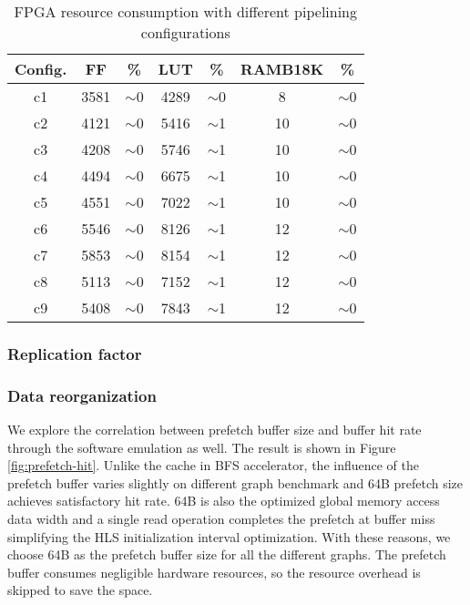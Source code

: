\begin{table}
  \caption{FPGA resource consumption with different pipelining configurations}
  \label{tab:hash-resource}
    \centering
  \begin{tabular}{ccccccc}
    \toprule
      Config. & FF & \% & LUT & \% & RAMB18K & \% \\
    \midrule
      c1 & 3581 & $\sim$0 & 4289 & $\sim$0 & 8  & $\sim$0 \\
      c2 & 4121 & $\sim$0 & 5416 & $\sim$1 & 10 & $\sim$0 \\
      c3 & 4208 & $\sim$0 & 5746 & $\sim$1 & 10 & $\sim$0 \\
      c4 & 4494 & $\sim$0 & 6675 & $\sim$1 & 10 & $\sim$0 \\
      c5 & 4551 & $\sim$0 & 7022 & $\sim$1 & 10 & $\sim$0 \\
      c6 & 5546 & $\sim$0 & 8126 & $\sim$1 & 12 & $\sim$0 \\
      c7 & 5853 & $\sim$0 & 8154 & $\sim$1 & 12 & $\sim$0 \\
      c8 & 5113 & $\sim$0 & 7152 & $\sim$1 & 12 & $\sim$0 \\
      c9 & 5408 & $\sim$0 & 7843 & $\sim$1 & 12 & $\sim$0 \\
  \bottomrule
\end{tabular}
\end{table}

\subsubsection{Replication factor}
\subsubsection{Data reorganization}
We explore the correlation between prefetch buffer size and  
buffer hit rate through the software emulation as well. The result is 
shown in Figure \ref{fig:prefetch-hit}. Unlike the cache in BFS accelerator,  
the influence of the prefetch buffer varies slightly on different 
graph benchmark and 64B prefetch size achieves satisfactory 
hit rate. 64B is also the optimized global memory access data width 
and a single read operation completes the prefetch at buffer miss simplifying the 
HLS initialization interval optimization. With these reasons, 
we choose 64B as the prefetch buffer size for all the different graphs.
The prefetch buffer consumes negligible hardware resources, so the resource overhead 
is skipped to save the space.

